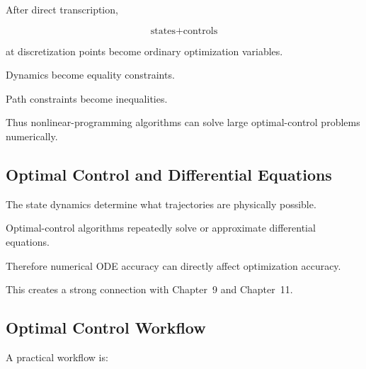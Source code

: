 After direct transcription,

\[
\boxed{
\text{states}
+
\text{controls}
}
\]

at discretization points become ordinary optimization variables.

Dynamics become equality constraints.

Path constraints become inequalities.

Thus nonlinear-programming algorithms can solve large optimal-control
problems numerically.

\subsection{Optimal Control and Differential Equations}
\label{subsec:optimal-control-ode-connection}

The state dynamics determine what trajectories are physically possible.

Optimal-control algorithms repeatedly solve or approximate differential
equations.

Therefore numerical ODE accuracy can directly affect optimization
accuracy.

This creates a strong connection with Chapter~9 and Chapter~11.

\subsection{Optimal Control Workflow}
\label{subsec:optimal-control-workflow}

A practical workflow is:

